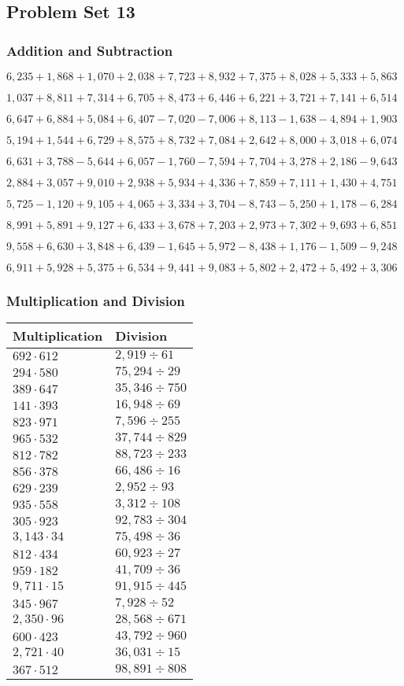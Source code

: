 \hypertarget{problem-set-13-3}{%
\subsection{Problem Set 13}\label{problem-set-13-3}}

\hypertarget{addition-and-subtraction-175}{%
\subsubsection{Addition and
Subtraction}\label{addition-and-subtraction-175}}

\(6,235+1,868+1,070+2,038+7,723+8,932+7,375+8,028+5,333+ 5,863\)

\(1,037+8,811+7,314+6,705+8,473+6,446+6,221+3,721+7,141+6,514\)

\(6,647+6,884+5,084+6,407-7,020-7,006+8,113-1,638-4,894+1,903\)

\(5,194+1,544+6,729+8,575+8,732+7,084+2,642+8,000+3,018+6,074\)

\(6,631+3,788-5,644+6,057-1,760-7,594+7,704+3,278+2,186-9,643\)

\(2,884+3,057+9,010+2,938+5,934+4,336+7,859+7,111+1,430+4,751\)

\(5,725-1,120+9,105+4,065+3,334+3,704-8,743-5,250+1,178-6,284\)

\(8,991+5,891+9,127+6,433+3,678+7,203+2,973+7,302+9,693+6,851\)

\(9,558+6,630+3,848+6,439-1,645+5,972-8,438+1,176-1,509-9,248\)

\(6,911+5,928+5,375+6,534+9,441+9,083+5,802+2,472+5,492+3,306\)

\hypertarget{multiplication-and-division-174}{%
\subsubsection{Multiplication and
Division}\label{multiplication-and-division-174}}

\begin{longtable}[]{@{}ll@{}}
\toprule
Multiplication & Division\tabularnewline
\midrule
\endhead
\(692\cdot612\) & \(2,919÷61\)\tabularnewline
\(294\cdot580\) & \(75,294÷29\)\tabularnewline
\(389\cdot647\) & \(35,346÷750\)\tabularnewline
\(141\cdot393\) & \(16,948÷69\)\tabularnewline
\(823\cdot971\) & \(7,596÷255\)\tabularnewline
\(965\cdot532\) & \(37,744÷829\)\tabularnewline
\(812\cdot782\) & \(88,723÷233\)\tabularnewline
\(856\cdot378\) & \(66,486÷16\)\tabularnewline
\(629\cdot239\) & \(2,952÷93\)\tabularnewline
\(935\cdot558\) & \(3,312÷108\)\tabularnewline
\(305\cdot923\) & \(92,783÷304\)\tabularnewline
\(3,143\cdot34\) & \(75,498÷36\)\tabularnewline
\(812\cdot434\) & \(60,923÷27\)\tabularnewline
\(959\cdot182\) & \(41,709÷36\)\tabularnewline
\(9,711\cdot15\) & \(91,915÷445\)\tabularnewline
\(345\cdot967\) & \(7,928÷52\)\tabularnewline
\(2,350\cdot96\) & \(28,568÷671\)\tabularnewline
\(600\cdot423\) & \(43,792÷960\)\tabularnewline
\(2,721\cdot40\) & \(36,031÷15\)\tabularnewline
\(367\cdot512\) & \(98,891÷808\)\tabularnewline
\bottomrule
\end{longtable}

